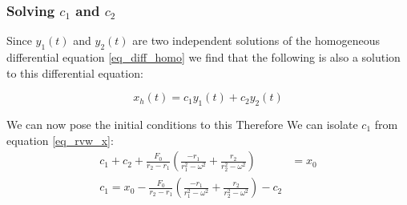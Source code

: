 \subsubsection{Solving $c_1$ and $c_2$}
Since $y_1(t)$ and $y_2(t)$ are two independent solutions of the homogeneous  differential equation \ref{eq_diff_homo} we find that the following is also a solution to this differential equation:

\begin{equation*}
x_h(t) = c_1 y_1(t) + c_2 y_2(t)
\end{equation*}

We can now pose the initial conditions to this 
Therefore
We can isolate $c_1$ from equation \ref{eq_rvw_x}:
\begin{align*}
	c_1  + c_2 +  \frac{F_0}{r_2 - r_1} \left(  \frac{-r_1}{r_1^2 - \omega^2} +  \frac{r_2}{r_2^2 - \omega^2}   \right) &= x_0 \\
	c_1 = x_0 -  \frac{F_0}{r_2 - r_1} \left(  \frac{-r_1}{r_1^2 - \omega^2} +  \frac{r_2}{r_2^2 - \omega^2}   \right)  - c_2
\end{align*}


